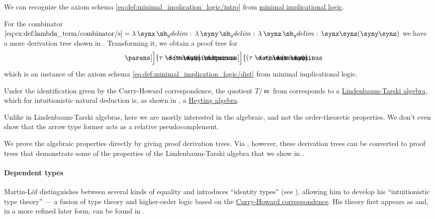 \begin{example}
\begin{thmenum}
    We can recognize the axiom schema \eqref{eq:def:minimal_implication_logic/intro} from \hyperref[def:minimal_implication_logic]{minimal implicational logic}.

    For the combinator \( \ref{eq:ex:def:lambda_term/combinator/s} = \qabs \synx \qabs \syny \qabs \synz \synx \synz (\syny \synz) \) we have a more derivation tree shown in . Transforming it, we obtain a proof tree for
    \begin{equation*}
      \parens[\Big]{ \tau \synimplies (\sigma \synimplies \rho) } \synimplies \parens[\Big]{ (\tau \synimplies \sigma) \synimplies (\tau \synimplies \rho)},
    \end{equation*}
    which is an instance of the axiom schema \eqref{eq:def:minimal_implication_logic/dist} from minimal implicational logic.

     Under the identification given by the Curry-Howard correspondence, the quotient \( T / {\gleichstark} \) from  corresponds to a \hyperref[def:lindenbaum_tarski_algebra]{Lindenbaum-Tarski algebra}, which for intuitionistic natural deduction is, as shown in , a \hyperref[def:heyting_algebra]{Heyting algebra}.

    Unlike in Lindenbaum-Tarski algebras, here we are mostly interested in the algebraic, and not the order-theoretic properties. We don't even show that the arrow type former acts as a relative pseudocomplement.

    We prove the algebraic properties directly by giving proof derivation trees. Via , however, these derivation trees can be converted to proof trees that demonstrate some of the properties of the Lindenbaum-Tarski algebra that we show in .
  \end{thmenum}
\end{example}

\paragraph{Dependent types}

\begin{concept}\label{con:identity_types}

  Martin-L\"of distinguishes between several kinds of equality and introduces \enquote{identity types} (see ), allowing him to develop his \enquote{intuitionistic type theory} --- a fusion of type theory and higher-order logic based on the \hyperref[con:curry_howard_correspondence]{Curry-Howard correspondence}. His theory first appears as \cite{MartinLöf1975IntuitionisticTypeTheory} and, in a more refined later form, can be found in \cite{MartinLöf1984IntuitionisticTypeTheory}.
\end{concept}

